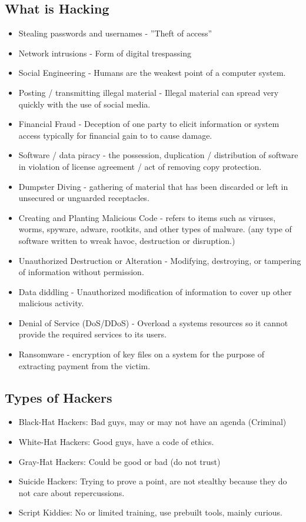 \subsection{What is Hacking}
\begin{itemize}
    \item Stealing passwords and usernames - ''Theft of access'' 
    \item Network intrusions - Form of digital trespassing
    \item Social Engineering - Humans are the weakest point of a computer system.
    \item Posting / transmitting illegal material - Illegal material can spread very quickly with the use of social media.
    \item Financial Fraud - Deception of one party to elicit information or system access typically for financial gain to to cause damage.
    \item Software / data piracy - the possession, duplication / distribution of software in violation of license agreement / act of removing copy protection.
    \item Dumpster Diving - gathering of material that has been discarded or left in unsecured or unguarded receptacles.
    \item Creating and Planting Malicious Code - refers to items such as viruses, worms, spyware, adware, rootkits, and other types of malware. (any type of software written to wreak havoc, destruction or disruption.)
    \item Unauthorized Destruction or Alteration - Modifying, destroying, or tampering of information without permission.
    \item Data diddling - Unauthorized modification of information to cover up other malicious activity.
    \item Denial of Service (DoS/DDoS) - Overload a systems resources so it cannot provide the required services to its users.
    \item Ransomware - encryption of key files on a system for the purpose of extracting payment from the victim.
\end{itemize}

\subsection{Types of Hackers}
\begin{itemize}
    \item Black-Hat Hackers: Bad guys, may or may not have an agenda (Criminal)
    \item White-Hat Hackers: Good guys, have a code of ethics.
    \item Gray-Hat Hackers: Could be good or bad (do not trust)
    \item Suicide Hackers: Trying to prove a point, are not stealthy because they do not care about repercussions.
    \item Script Kiddies: No or limited training, use prebuilt tools, mainly curious.
\end{itemize}

